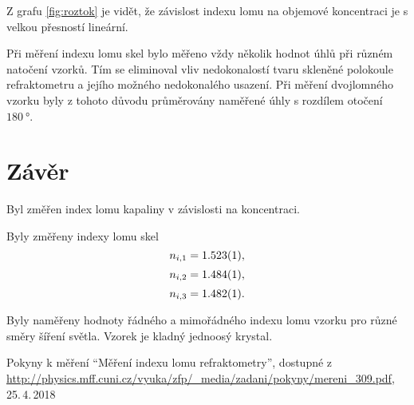 \documentclass{protokol}
\begin{document}
    Z grafu \ref{fig:roztok} je vidět, že závislost indexu lomu na objemové koncentraci je s velkou přesností lineární. 

    Při měření indexu lomu skel bylo měřeno vždy několik hodnot úhlů při různém natočení vzorků. Tím se eliminoval vliv nedokonalostí tvaru skleněné polokoule refraktometru a jejího možného nedokonalého usazení. Při měření dvojlomného vzorku byly z tohoto důvodu průměrovány naměřené úhly s rozdílem otočení $\SI{180}{\degree}$.

  \section*{Závěr}

    Byl změřen index lomu kapaliny v závislosti na koncentraci.

    Byly změřeny indexy lomu skel
    $$ n_{i,1} = \SI{1.523 \pm 0.001}{}, $$
    $$ n_{i,2} = \SI{1.484 \pm 0.001}{}, $$
    $$ n_{i,3} = \SI{1.482 \pm 0.001}{}. $$

    Byly naměřeny hodnoty řádného a mimořádného indexu lomu vzorku pro různé směry šíření světla. Vzorek je kladný jednoosý krystal.

  \begin{thebibliography}{} 

    Pokyny k měření ``Měření indexu lomu refraktometry'', dostupné z\\ \url{http://physics.mff.cuni.cz/vyuka/zfp/_media/zadani/pokyny/mereni_309.pdf}, 25.\,4.\,2018
   
  \end{thebibliography}
\end{document}
